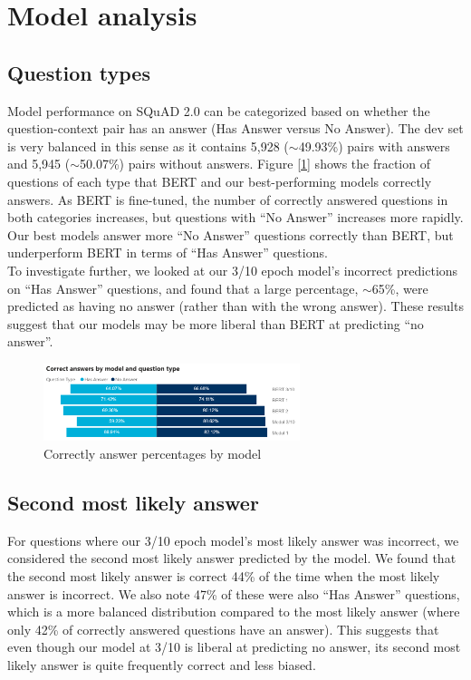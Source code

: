 \section{Model analysis}

\subsection{Question types}

Model performance on SQuAD 2.0 can be categorized based on whether the question-context pair has an answer (Has Answer versus No Answer). The dev set is very balanced in this sense as it contains 5,928 ($\sim$49.93\%) pairs with answers and 5,945 ($\sim$50.07\%) pairs without answers. Figure [\ref{fig:qa_correct_answers_by_model_and_type}] shows the fraction of questions of each type that BERT and our best-performing models correctly answers. As BERT is fine-tuned, the number of correctly answered questions in both categories increases, but questions with “No Answer” increases more rapidly. Our best models answer more “No Answer” questions correctly than BERT, but underperform BERT in terms of “Has Answer” questions. \\

To investigate further, we looked at our 3/10 epoch model’s incorrect predictions on “Has Answer” questions, and found that a large percentage, $\sim$65\%, were predicted as having no answer (rather than with the wrong answer). These results suggest that our models may be more liberal than BERT at predicting “no answer”.

\begin{figure}[ht]
	\centering
	\includegraphics[width=7.5cm]{images/QA_Correct_Answers_by_Question_Type.png}
	\caption{\label{fig:qa_correct_answers_by_model_and_type}Correctly answer percentages by model}
\end{figure}

\subsection{Second most likely answer}

For questions where our 3/10 epoch model’s most likely answer was incorrect, we considered the second most likely answer predicted by the model. We found that the second most likely answer is correct 44\% of the time when the most likely answer is incorrect. We also note 47\% of these were also “Has Answer” questions, which is a more balanced distribution compared to the most likely answer (where only 42\% of correctly answered questions have an answer). This suggests that even though our model at 3/10 is liberal at predicting no answer, its second most likely answer is quite frequently correct and less biased. 

